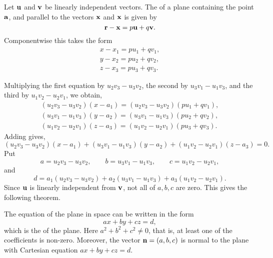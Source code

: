 \begin{thm}Let  $\mathbf{ u}$ and  $\mathbf{ v}$  be linearly
independent vectors. The  of a plane
containing the point ${\mathbf a}$, and parallel to the vectors
$\mathbf{ x}$ and $\mathbf{ x}$ is given by
$$
\mathbf{ r} -\mathbf{ x} = p\mathbf{ u} + q\mathbf{ v}.$$ Componentwise
this takes the form
$$\begin{array}{c}x - x_1 = pu_1  + qv_1, \\ y - x_2 = pu_2  + qv_2, \\ z - x_3 = pu_3  + qv_3. \end{array} $$

\end{thm}


Multiplying the first equation by $u_2v_3-u_3v_2$, the second by
$u_3v_1-u_1v_3$, and the third by $u_1v_2-u_2v_1$, we obtain,
$$\begin{array}{c}(u_2v_3-u_3v_2)(x - a_1) = (u_2v_3-u_3v_2)(pu_1  + qv_1), \\
(u_3v_1-u_1v_3)(y - a_2) = (u_3v_1-u_1v_3)(pu_2  + qv_2), \\
(u_1v_2-u_2v_1)(z - a_3) = (u_1v_2-u_2v_1)(pu_3  + qv_3).
\end{array}
$$
Adding gives,
$$(u_2v_3-u_3v_2)(x - a_1)+ (u_3v_1-u_1v_3)(y - a_2)+(u_1v_2-u_2v_1)(z - a_3)=0.   $$
Put $$a=u_2v_3-u_3v_2, \qquad b=u_3v_1-u_1v_3, \qquad
c=u_1v_2-u_2v_1,$$and $$d = a_1(u_2v_3-u_3v_2)+a_2(u_3v_1-u_1v_3) +
a_3(u_1v_2-u_2v_1).
$$ Since $\mathbf{ u}$ is linearly independent from $\mathbf{ v}$, not all of $a, b, c$ are zero.
This gives the following theorem.
\begin{thm}\label{thm:cartesian-eq-of-plane}
The equation of the plane in space can be written in the form
$$ax+by+cz=d,  $$
which is the  of the plane. Here $a^2 + b^2
+ c^2 \neq 0$, that is, at least one of the coefficients is
non-zero. Moreover, the vector $\mathbf{ n}=\left( a, b , c \right)$ is
normal to the plane with Cartesian equation $ax + by + cz = d$.
\end{thm}
